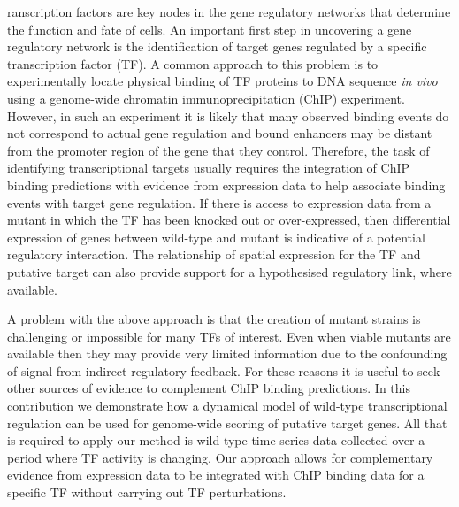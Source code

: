 \documentclass{pnastwo}
\begin{document}
\begin{article}
\begin{abstract}

\end{abstract}



ranscription factors are key nodes in the gene regulatory
networks that determine the function and fate of
cells. An important first step in uncovering a gene regulatory network
is the identification of target genes regulated by a specific
transcription factor (TF). A
common approach to this problem is to experimentally locate physical binding
of TF proteins to DNA sequence {\em in vivo} using a genome-wide
chromatin immunoprecipitation (ChIP) experiment. However, in such an
experiment it is likely that many observed binding events do not
correspond to actual gene regulation and bound enhancers may be
distant from the promoter region of the gene that they control. Therefore, the task of identifying transcriptional
targets usually requires the integration of ChIP binding predictions
with evidence from expression data to help associate binding events
with target gene regulation. If there is access to expression data from a mutant in which the TF has
been knocked out or over-expressed, then differential expression of genes between wild-type
and mutant is indicative of a potential regulatory
interaction. The relationship of spatial expression for the
TF and putative target can also provide support for a hypothesised
regulatory link, where available. 

A problem with the above approach is that the creation of mutant
strains is challenging or impossible for many TFs of interest. Even
when viable mutants are available then they may provide very limited information due to the
confounding of signal from indirect regulatory feedback. For these reasons it
is useful to seek other sources of evidence to complement ChIP binding
predictions. In this contribution we demonstrate how a dynamical model of wild-type transcriptional
regulation can be used for genome-wide scoring of putative target genes. All that is required to apply
our method is wild-type time series data collected over a period
where TF activity is changing. Our approach allows for complementary
evidence from expression data to be integrated with ChIP binding data
for a specific TF without carrying out TF perturbations. 


\end{article}
\end{document}
